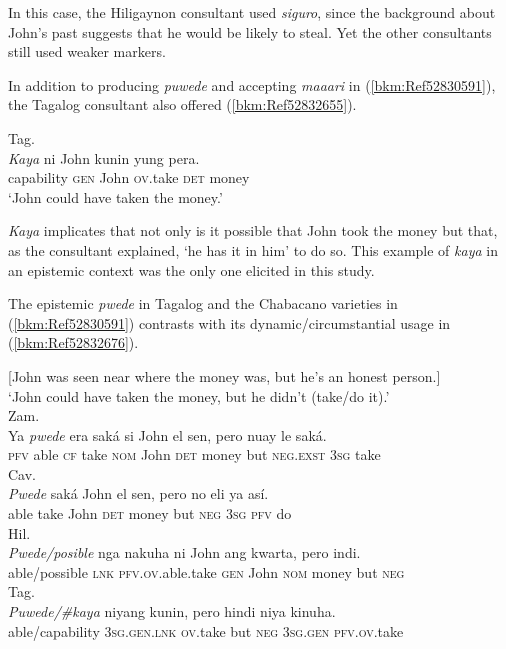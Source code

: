 \documentclass[output=paper,colorlinks,citecolor=brown]{langscibook}
\begin{document}
In this case, the Hiligaynon consultant used \textit{siguro}, since the background about John’s past suggests that he would be likely to steal. Yet the other consultants still used weaker markers.

In addition to producing \textit{puwede} and accepting \textit{maaari} in (\ref{bkm:Ref52830591}), the Tagalog consultant also offered (\ref{bkm:Ref52832655}).

\ea
{\label{bkm:Ref52832655}Tag.}\\
\gll \textit{Kaya} ni John kunin yung pera. \\
capability \textsc{gen} John \textsc{ov.}take \textsc{det} money\\
\glt `John could have taken the money.'\\
\z

\textit{Kaya} implicates that not only is it possible that John took the money but that, as the consultant explained, ‘he has it in him’ to do so. This example of \textit{kaya} in an epistemic context was the only one elicited in this study.

The epistemic \textit{pwede} in Tagalog and the Chabacano varieties in (\ref{bkm:Ref52830591}) contrasts with its dynamic/circumstantial usage in (\ref{bkm:Ref52832676}).

\ea  
{\label{bkm:Ref52832676}[John was seen near where the money was, but he’s an honest person.]}\\
{‘John could have taken the money, but he didn’t (take/do it).’}\\
\ea
{Zam.}\\
\gll Ya \textit{pwede} era saká si John el sen, pero nuay le saká.\\
     \textsc{pfv} able \textsc{cf} take \textsc{nom} John \textsc{det} money but \textsc{neg}.\textsc{exst} 3\textsc{sg} take\\
\ex
{Cav.}\\
\gll \textit{Pwede} saká John el sen, pero no eli ya así.\\
     able take John \textsc{det} money but \textsc{neg} 3\textsc{sg} \textsc{pfv} do\\
\ex
{Hil.}\\
\gll \textit{Pwede/posible} nga  nakuha                     ni        John ang kwarta, pero indi.\\
     able/possible  \textsc{lnk} \textsc{pfv.ov}.able.take \textsc{gen} John \textsc{nom} money but \textsc{neg}\\
\ex
{Tag.}\\
\gll \textit{Puwede/\#kaya} niyang kunin, pero hindi niya kinuha.\\
able/capability 3\textsc{sg.gen.lnk} \textsc{ov.}take but \textsc{neg} {3}\textsc{sg.gen} \textsc{pfv.ov}{.take}\\
\z
\z
\end{document}

